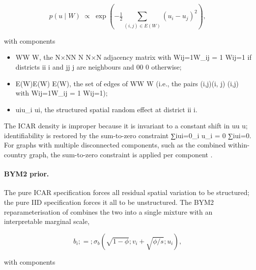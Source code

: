 \documentclass{article}
\begin{document}
\begin{equation}

p(u \mid W) \;\propto\; \exp\!\left( -\tfrac{1}{2} \sum_{(i, j) \in E(W)} (u_i - u_j)^{2} \right),

\label{eq:icar}

\end{equation}

with components

\begin{itemize}

\item WW
W, the N×NN \times N
N×N adjacency matrix with Wij=1W_{ij} = 1
Wij​=1 if districts ii
i and jj
j are neighbours and 00
0 otherwise;

\item E(W)E(W)
E(W), the set of edges of WW
W (i.e., the pairs (i,j)(i, j)
(i,j) with Wij=1W_{ij} = 1
Wij​=1);

\item uiu_i
ui​, the structured spatial random effect at district ii
i.

\end{itemize}

The ICAR density is improper because it is invariant to a constant shift
in uu u; identifiability is restored by the sum-to-zero constraint
∑iui=0\sum\_i u\_i = 0 ∑i\hspace{0pt}ui\hspace{0pt}=0. For graphs with
multiple disconnected components, such as the combined within-country
graph, the sum-to-zero constraint is applied per component
\citep{freni2018}.

\paragraph{BYM2 prior.}

The pure ICAR specification forces all residual spatial variation to be
structured; the pure IID specification forces it all to be unstructured.
The BYM2 reparameterisation of \citep{riebler2016} combines the two into
a single mixture with an interpretable marginal scale,

\begin{equation}

b_i ;=; \sigma_b \left( \sqrt{1 - \phi} ; v_i + \sqrt{\phi / s} ; u_i \right),

\label{eq:bym2}

\end{equation}

with components
\end{document}
